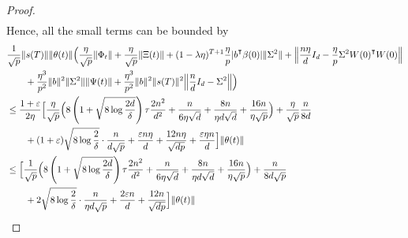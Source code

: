\begin{proof}
\begin{align*}
    \end{align*}
    Hence, all the small terms can be bounded by
    \begin{align*}
        &\frac{1}{\sqrt{p}} \|s(T)\|\|\theta(t)\| \Big( \frac{\eta}{\sqrt{p}} \|\Phi_t\| + \frac{\eta}{\sqrt p} \|\Xi(t)\| + (1-\lambda\eta)^{T+1} \frac{\eta}{p} |b\transpose\beta(0)| \|\Sigma^2\| + \Big\| \frac{n\eta}{d}I_d - \frac{\eta}{p}\Sigma^2 W(0)\transpose W(0) \Big\| \\
        & \qquad + \frac{\eta^3}{p^2} \|b\|^2 \|\Sigma^2\| \|\Psi(t)\| + \frac{\eta^3}{p^2} \|b\|^2 \|s(T)\|^2 \Big\| \frac{n}{d}I_d - \Sigma^2 \Big\| \Big) \\
        & \leq \frac{1+\eps}{2\eta}  \Big[ \frac{\eta}{\sqrt{p}} \Big( 8\left(1 + \sqrt{8\log\frac{2d}{\delta}}\right) \tau \frac{2n^2}{d^2} + \frac{n}{6\eta \sqrt{d}} + \frac{8n}{\eta d\sqrt{d}} + \frac{16n}{\eta\sqrt{p}} \Big) + \frac{\eta}{\sqrt p} \frac{n}{8d} \\
        & \qquad + (1+\eps)\sqrt{8\log\frac{2}{\delta}} \cdot \frac{n}{d\sqrt{p}} + \frac{\eps n\eta}{d} + \frac{12n\eta}{\sqrt{dp}} + \frac{\eps\eta n}{d} \Big] \|\theta(t)\| \\
        & \leq \Big[ \frac{1}{\sqrt{p}} \Big( 8\left(1 + \sqrt{8\log\frac{2d}{\delta}}\right) \tau \frac{2n^2}{d^2} + \frac{n}{6\eta \sqrt{d}} + \frac{8n}{\eta d\sqrt{d}} + \frac{16n}{\eta\sqrt{p}} \Big) + \frac{n}{8d\sqrt{p}} \\
        & \qquad + 2\sqrt{8\log\frac{2}{\delta}} \cdot \frac{n}{\eta d\sqrt{p}} + \frac{2\eps n}{d} + \frac{12n}{\sqrt{dp}} \Big] \|\theta(t)\|
    \end{align*}
    

\end{proof}

